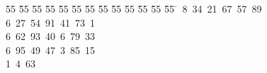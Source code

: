 %
%
\begin{tabbing}
55 \= 55 \= 55 \= 55 \= 55 \= 55 \= 55 \= 55 \= 55 \= 55 \= 55 \= 55 \= 55 \= \ 8\ 34\ 21\ 67\ 57\ 89\\[0pt]
6\ 27\ 54\ 91\ 41\ 73\ 1\\[0pt]
6\ 62\ 93\ 40\ 6\ 79\ 33\\[0pt]
6\ 95\ 49\ 47\ 3\ 85\ 15\\[0pt]
1\ 4\ 63\\[0pt]
\end{tabbing}
